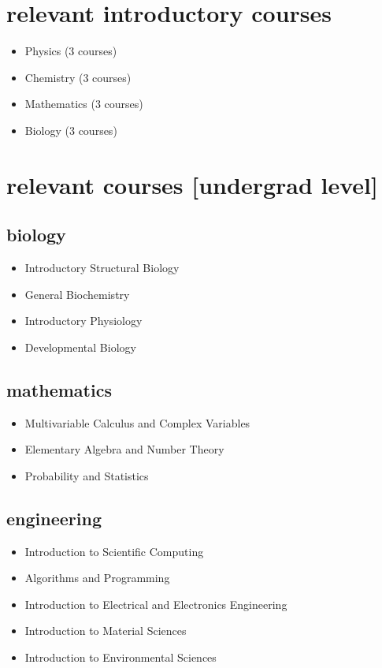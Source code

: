\documentclass[11pt]{friggeri-cv}%
\begin{document}
\begin{multicols}{2}[]
\begin{minipage}{1.1\columnwidth}
\section{ relevant introductory courses }
\begin{itemize}
\item Physics (3 courses)
\item Chemistry (3 courses)
\item Mathematics (3 courses)
\item Biology (3 courses)
\end{itemize}



\end{minipage}

\hspace{-1em}
\begin{minipage}{1.05\columnwidth}



\section{relevant courses [undergrad level]}

\subsection{biology}
\begin{itemize}

\item Introductory Structural Biology
\item General Biochemistry
\item Introductory Physiology
\item Developmental Biology
\end{itemize}


\subsection{mathematics}
\begin{itemize}
\item Multivariable Calculus and Complex Variables
\item Elementary Algebra and Number Theory
\item Probability and Statistics
\end{itemize}



\subsection{engineering}
\begin{itemize}
\item Introduction to Scientific Computing
\item Algorithms and Programming
\item Introduction to Electrical and Electronics Engineering
\item Introduction to Material Sciences
\item Introduction to Environmental Sciences
\end{itemize}


\end{minipage}
\end{multicols}
\end{document}

